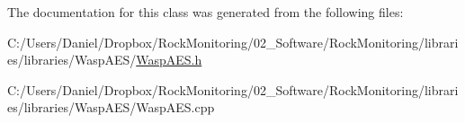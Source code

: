 The documentation for this class was generated from the following files\+:\begin{DoxyCompactItemize}
\item 
C\+:/\+Users/\+Daniel/\+Dropbox/\+Rock\+Monitoring/02\+\_\+\+Software/\+Rock\+Monitoring/libraries/libraries/\+Wasp\+A\+E\+S/\hyperlink{_wasp_a_e_s_8h}{Wasp\+A\+E\+S.\+h}\item 
C\+:/\+Users/\+Daniel/\+Dropbox/\+Rock\+Monitoring/02\+\_\+\+Software/\+Rock\+Monitoring/libraries/libraries/\+Wasp\+A\+E\+S/Wasp\+A\+E\+S.\+cpp\end{DoxyCompactItemize}

